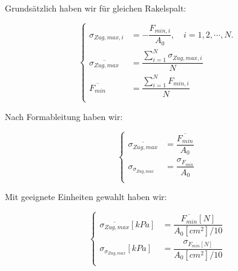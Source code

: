 \documentclass[12pt,UTF8]{article}
\begin{document}
Grunds\"atzlich haben wir f\"ur gleichen Rakelspalt:
\begin{center}
    \begin{equation}
        \left\{
        \begin{aligned}
            \sigma_{Zug,max,i}          & =-\dfrac{F_{min,i}}{A_0},\quad i=1,2,\cdots,N.      \\
            \overline{\sigma_{Zug,max}} & =\dfrac{\sum\limits_{i=1}^{N}\sigma_{Zug,max,i}}{N} \\
            \overline{F_{min}}          & =\dfrac{\sum\limits_{i=1}^{N}F_{min,i}}{N}          \\
        \end{aligned}
        \right.
    \end{equation}
\end{center}

Nach Formableitung haben wir:
\begin{center}
    \begin{equation}
        \left\{
        \begin{aligned}
            \overline{\sigma_{Zug,max}} & =\dfrac{\overline{F_{min}}}{A_0} \\
            \sigma_{\sigma_{Zug,max}}   & =\dfrac{\sigma_{F_{min}}}{A_0}   \\
        \end{aligned}
        \right.
    \end{equation}
\end{center}
Mit geeignete Einheiten gewahlt haben wir:
\begin{center}
    \begin{equation}
        \left\{
        \begin{aligned}
            \overline{\sigma_{Zug,max}}[kPa] & =\dfrac{\overline{F_{min}}[N]}{A_0[cm^2]/10} \\
            \sigma_{\sigma_{Zug,max}}[kPa]   & =\dfrac{\sigma_{F_{min}[N]}}{A_0[cm^2]/10}   \\
        \end{aligned}
        \right.
    \end{equation}
\end{center}
\newpage
\end{document}
